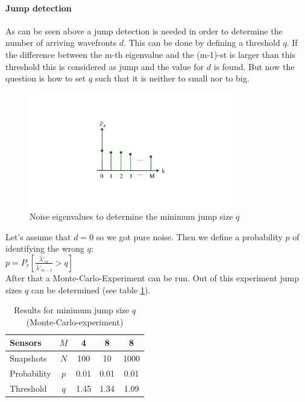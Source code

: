 \newpage
\paragraph{Jump detection}
As can be seen above a jump detection is needed in order to determine the number of arriving wavefronts $d$. This can be done by defining a threshold $q$. If the difference between the m-th eigenvalue and the (m-1)-st is larger than this threshold this is considered as jump and the value for $d$ is found. But now the question is how to set $q$ such that it is neither to small nor to big.\\

\begin{figure}[H]
	\centering
		\includegraphics[trim =5cm 5cm 5cm 4cm, clip, width=0.80\textwidth]{graphics/jump_detection_noise.pdf}
	\caption{Noise eigenvalues to determine the minimum jump size $q$}
	\label{fig:jump_detection_noise}
\end{figure}

Let's assume that $d=0$ so we got pure noise. Then we define a probability $p$ of identifying the wrong  $q$:\\

$p=P_r\left[\frac{\hat{\lambda}'_m}{\hat{\lambda}'_{m-1}}>q\right]$\\
After that a Monte-Carlo-Experiment can be run. Out of this experiment jump sizes $q$ can be determined (see table \ref{tab:min_step_size_q}).\\
\begin{table}[H]
\begin{center}
\begin{tabular}{lc|c|c|c}
Sensors&$M$&4&8&8\\
\hline
Snapshots&$N$&100&10&1000\\
\hline
Probability&$p$&0.01&0.01&0.01\\
\hline
Threshold&$q$&\textcolor[rgb]{1,0,0}{1.45}&\textcolor[rgb]{1,0,0}{1.34}&\textcolor[rgb]{1,0,0}{1.09}\\
\end{tabular}
\end{center}
\caption{Results for minimum jump size $q$ (Monte-Carlo-experiment)}
\label{tab:min_step_size_q}
\end{table}

